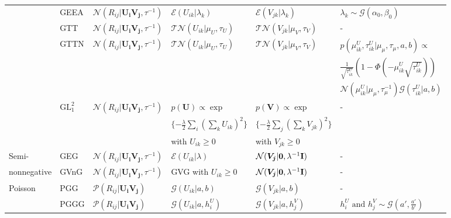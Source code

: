 \documentclass[letterpaper]{article} %
\newcommand{\U}{\boldsymbol U}
\newcommand{\Ui}{\boldsymbol{U_i}}
\newcommand{\V}{\boldsymbol V}
\newcommand{\Vj}{\boldsymbol{V_j}}
\begin{document}
\begin{table*}[t]
\begin{tabular}{llllll}
			& GEEA & $\mathcal{N} (R_{ij} | \Ui \Vj, \tau^{-1} )$ & $\mathcal{E} ( U_{ik} | \lambda_k )$ & $\mathcal{E} ( V_{jk} | \lambda_k )$ & $\lambda_k \sim \mathcal{G} ( \alpha_0, \beta_0 )$ \\
			& GTT & $\mathcal{N} (R_{ij} | \Ui \Vj, \tau^{-1} )$ & $\mathcal{TN} ( U_{ik} | \mu_U, \tau_U )$ & $\mathcal{TN} ( V_{jk} | \mu_V, \tau_V )$ & - \\
			& GTTN & $\mathcal{N} (R_{ij} | \Ui \Vj, \tau^{-1} )$ & $\mathcal{TN} ( U_{ik} | \mu_U, \tau_U )$ & $\mathcal{TN} ( V_{jk} | \mu_V, \tau_V )$ & $p(\mu^U_{ik}, \tau^U_{ik} | \mu_{\mu}, \tau_{\mu}, a, b) \propto $ \\
			& & & & & $\frac{1}{\sqrt{\tau^U_{ik}}} \left( 1 - \Phi ( - \mu^U_{ik} \sqrt{\tau^U_{ik}} ) \right)$ \\
			& & & & & $\mathcal{N} (\mu^U_{ik} | \mu_{\mu}, \tau_{\mu}^{-1} ) \mathcal{G} (\tau^U_{ik} | a, b)$ \\
			& G$\text{L}^2_1 $ & $\mathcal{N} (R_{ij} | \Ui \Vj, \tau^{-1} )$ & $p(\U) \propto \exp $ & $p(\V) \propto \exp $ & - \\
			& & & $ \lbrace -\frac{\lambda}{2} \sum_i ( \sum_k U_{ik} )^2 \rbrace $ & $ \lbrace -\frac{\lambda}{2} \sum_j ( \sum_k V_{jk} )^2 \rbrace $ & \\
			& & & with $U_{ik} \geq 0$ & with $V_{jk} \geq 0$ & \\
			\midrule
			Semi- & GEG & $\mathcal{N} (R_{ij} | \Ui \Vj, \tau^{-1} )$ & $\mathcal{E} ( U_{ik} | \lambda )$ & $\mathcal{N} ( \Vj | \boldsymbol 0, \lambda^{-1} \text{\textbf I} )$ & - \\
			nonnegative & GVnG & $\mathcal{N} (R_{ij} | \Ui \Vj, \tau^{-1} )$ & GVG with $U_{ik} \geq 0$ & $\mathcal{N} ( \Vj | \boldsymbol 0, \lambda^{-1} \text{\textbf I} )$ & - \\
			\midrule
			Poisson & PGG & $\mathcal{P} (R_{ij} | \Ui \Vj )$ & $\mathcal{G} ( U_{ik} | a, b )$ & $\mathcal{G} ( V_{jk} | a, b )$ & - \\
			& PGGG & $\mathcal{P} (R_{ij} | \Ui \Vj )$ & $\mathcal{G} ( U_{ik} | a, h^U_i )$ & $\mathcal{G} ( V_{jk} | a, h^V_j )$ & $h^U_i \text{ and } h^V_j \sim \mathcal{G} (a', \frac{a'}{b'})$ \\
			\bottomrule
		\end{tabular}
	\end{table*}
\end{document}
